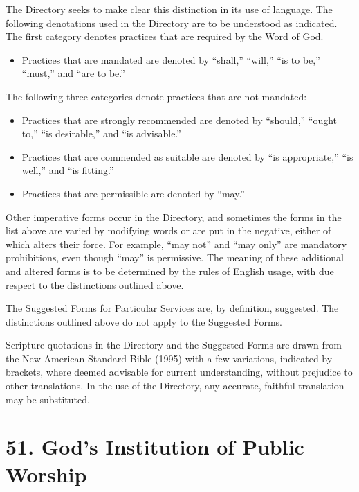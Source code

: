 \documentclass[
]{book}
\providecommand{\tightlist}{%
  \setlength{\itemsep}{0pt}\setlength{\parskip}{0pt}}
\begin{document}
The Directory seeks to make clear this distinction in its use of language. The following denotations used in the Directory are to be understood as indicated. The first category denotes practices that are required by the Word of God.

\begin{itemize}
\tightlist
\item
  Practices that are mandated are denoted by ``shall,'' ``will,'' ``is to be,'' ``must,'' and ``are to be.''
\end{itemize}

The following three categories denote practices that are not mandated:

\begin{itemize}
\item
  Practices that are strongly recommended are denoted by ``should,'' ``ought to,'' ``is desirable,'' and ``is advisable.''
\item
  Practices that are commended as suitable are denoted by ``is appropriate,'' ``is well,'' and ``is fitting.''
\item
  Practices that are permissible are denoted by ``may.''
\end{itemize}

Other imperative forms occur in the Directory, and sometimes the forms in the list above are varied by modifying words or are put in the negative, either of which alters their force. For example, ``may not'' and ``may only'' are mandatory prohibitions, even though ``may'' is permissive. The meaning of these additional and altered forms is to be determined by the rules of English usage, with due respect to the distinctions outlined above.

The Suggested Forms for Particular Services are, by definition, suggested. The distinctions outlined above do not apply to the Suggested Forms.

Scripture quotations in the Directory and the Suggested Forms are drawn from the New American Standard Bible (1995) with a few variations, indicated by brackets, where deemed advisable for current understanding, without prejudice to other translations. In the use of the Directory, any accurate, faithful translation may be substituted.

\hypertarget{gods-institution-of-public-worship}{%
\section*{51. God's Institution of Public Worship}\label{gods-institution-of-public-worship}}
\end{document}

